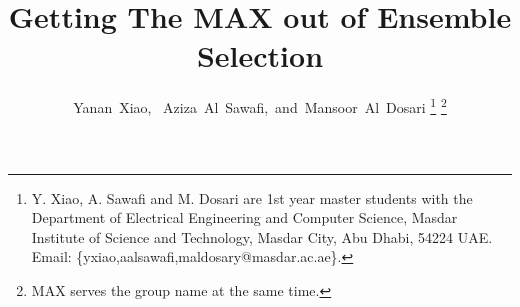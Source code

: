\documentclass[journal]{IEEEtran}
\begin{document}
%

\title{Getting The MAX out of Ensemble Selection}

%
%
%

\author{Yanan~Xiao,~
Aziza~Al~Sawafi,~and~Mansoor~Al~Dosari%
\thanks{Y. Xiao, A. Sawafi and M. Dosari are 1st year master students with the Department of
Electrical Engineering and Computer Science, Masdar Institute of Science and Technology, Masdar City,
Abu Dhabi, 54224 UAE. Email: \{yxiao,aalsawafi,maldosary@masdar.ac.ae\}.}%
\thanks{MAX serves the group name at the same time.}}
%

%
%
\end{document}
